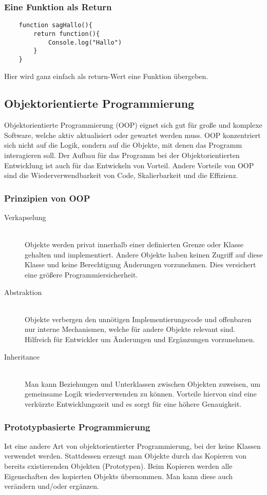 \subsubsection{Eine Funktion als Return}
\begin{lstlisting}
    function sagHallo(){
        return function(){
            Console.log("Hallo")
        }
    }
\end{lstlisting}
Hier wird ganz einfach als return-Wert eine Funktion übergeben.

\subsection{Objektorientierte Programmierung}
Objektorientierte Programmierung (OOP) eignet sich gut für große und komplexe Software, welche aktiv 
aktualisiert oder gewartet werden muss. OOP konzentriert sich nicht auf die Logik, sondern auf die 
Objekte, mit denen das Programm interagieren soll. Der Aufbau für das Programm bei der 
Objektorientierten Entwicklung ist auch für das Entwickeln von Vorteil. Andere Vorteile von OOP 
sind die Wiederverwendbarkeit von Code, Skalierbarkeit und die Effizienz.~\cite{OOP}

\subsubsection{Prinzipien von OOP}
\begin{description}
\item[Verkapselung]\hfill \\
 Objekte werden privat innerhalb einer definierten Grenze oder Klasse gehalten und implementiert. 
 Andere Objekte haben keinen Zugriff auf diese Klasse und keine Berechtigung
 Änderungen vorzunehmen. Dies versichert eine größere Programmiersicherheit.
\item[Abstraktion]\hfill \\
Objekte verbergen den unnötigen Implementierungscode und offenbaren nur interne Mechanismen, welche 
für andere Objekte relevant sind. Hilfreich für Entwickler um Änderungen und Ergänzungen vorzunehmen.
\item[Inheritance]\hfill \\
Man kann Beziehungen und Unterklassen zwischen Objekten zuweisen, um gemeinsame Logik 
wiederverwenden zu können. Vorteile hiervon sind eine verkürzte Entwicklungszeit und 
es sorgt für eine höhere Genauigkeit.
\end{description}

\subsubsection{Prototypbasierte Programmierung}
Ist eine andere Art von objektorientierter Programmierung, bei der keine Klassen verwendet werden. 
Stattdessen erzeugt man Objekte durch das Kopieren von bereits existierenden Objekten (Prototypen). 
Beim Kopieren werden alle Eigenschaften des kopierten Objekts übernommen. 
Man kann diese auch verändern und/oder ergänzen.